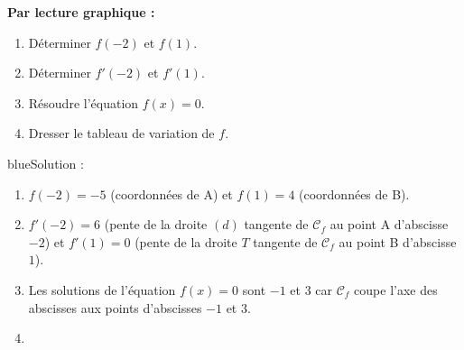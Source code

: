 \textbf{Par lecture graphique :}
\begin{enumerate}
\item Déterminer $f(-2)$ et $f(1)$.
\item Déterminer $f'(-2)$ et $f'(1)$.
\item Résoudre l'équation $f(x)=0$.
\item Dresser le tableau de variation de $f$.
\end{enumerate}

\begin{color}{blue}Solution :\par
\begin{enumerate}
\item $f(-2) = -5$ (coordonnées de A) et $f(1) = 4$ (coordonnées de B).
\item $f'(-2) = 6$ (pente de la droite $(d)$ tangente de $\mathcal{C}_f$ au point A d'abscisse $-2$) et $f'(1) = 0$ (pente de la droite $T$ tangente de $\mathcal{C}_f$ au point B d'abscisse $1$).
\item Les solutions de l'équation $f(x)=0$ sont $-1$ et $3$ car $\mathcal{C}_f$ coupe l'axe des abscisses aux points d'abscisses  $-1$ et $3$.
\item \ {}


\end{enumerate}
\end{color}

